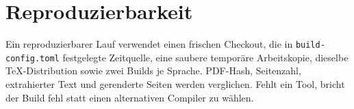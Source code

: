 \section{Reproduzierbarkeit}
\label{app:reproducibility}

Ein reproduzierbarer Lauf verwendet einen frischen Checkout, die in
\texttt{build-config.toml} festgelegte Zeitquelle, eine saubere temporäre Arbeitskopie,
dieselbe TeX-Distribution sowie zwei Builds je Sprache. PDF-Hash, Seitenzahl, extrahierter
Text und gerenderte Seiten werden verglichen. Fehlt ein Tool, bricht der Build fehl statt
einen alternativen Compiler zu wählen.
